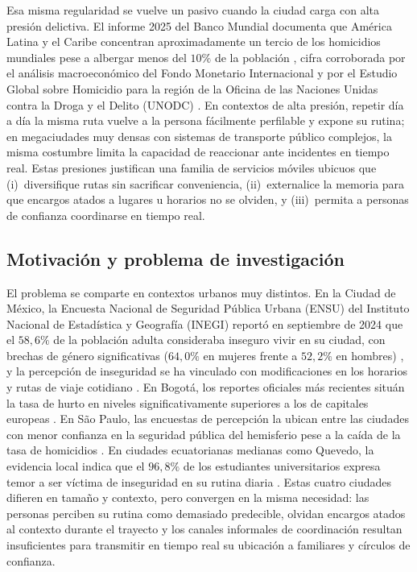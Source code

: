 \documentclass[a4paper,fleqn]{cas-sc}
\begin{document}
	Esa misma regularidad se vuelve un pasivo cuando la ciudad carga con alta presi\'on delictiva. El informe 2025 del Banco Mundial documenta que Am\'erica Latina y el Caribe concentran aproximadamente un tercio de los homicidios mundiales pese a albergar menos del $10\%$ de la poblaci\'on \citep{maloney2025worldbank}, cifra corroborada por el an\'alisis macroecon\'omico del Fondo Monetario Internacional \citep{bisca2024violent} y por el Estudio Global sobre Homicidio para la regi\'on de la Oficina de las Naciones Unidas contra la Droga y el Delito (UNODC) \citep{unodc2023gshlac}. En contextos de alta presi\'on, repetir d\'ia a d\'ia la misma ruta vuelve a la persona f\'acilmente perfilable y expone su rutina; en megaciudades muy densas con sistemas de transporte p\'ublico complejos, la misma costumbre limita la capacidad de reaccionar ante incidentes en tiempo real. Estas presiones justifican una familia de servicios m\'oviles ubicuos que (i)~diversifique rutas sin sacrificar conveniencia, (ii)~externalice la memoria para que encargos atados a lugares u horarios no se olviden, y (iii)~permita a personas de confianza coordinarse en tiempo real.
	
	\subsection{Motivaci\'on y problema de investigaci\'on}\label{sec:motivation}
	
	El problema se comparte en contextos urbanos muy distintos. En la Ciudad de M\'exico, la Encuesta Nacional de Seguridad P\'ublica Urbana (ENSU) del Instituto Nacional de Estad\'istica y Geograf\'ia (INEGI) report\'o en septiembre de 2024 que el $58{,}6\%$ de la poblaci\'on adulta consideraba inseguro vivir en su ciudad, con brechas de g\'enero significativas ($64{,}0\%$ en mujeres frente a $52{,}2\%$ en hombres) \citep{inegi2024ensu}, y la percepci\'on de inseguridad se ha vinculado con modificaciones en los horarios y rutas de viaje cotidiano \citep{maloney2025worldbank}. En Bogot\'a, los reportes oficiales m\'as recientes situ\'an la tasa de hurto en niveles significativamente superiores a los de capitales europeas \citep{bisca2024violent}. En S\~ao Paulo, las encuestas de percepci\'on la ubican entre las ciudades con menor confianza en la seguridad p\'ublica del hemisferio pese a la ca\'ida de la tasa de homicidios \citep{unodc2023gshlac}. En ciudades ecuatorianas medianas como Quevedo, la evidencia local indica que el $96{,}8\%$ de los estudiantes universitarios expresa temor a ser v\'ictima de inseguridad en su rutina diaria \citep{tapia2024inseguridad}. Estas cuatro ciudades difieren en tama\~no y contexto, pero convergen en la misma necesidad: las personas perciben su rutina como demasiado predecible, olvidan encargos atados al contexto durante el trayecto y los canales informales de coordinaci\'on resultan insuficientes para transmitir en tiempo real su ubicaci\'on a familiares y c\'irculos de confianza.
	
\end{document}
